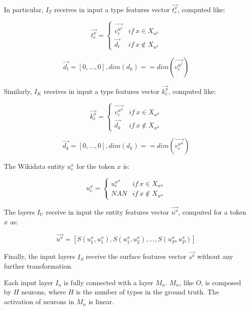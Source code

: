 \documentclass{llncs}
\begin{document}
In particular, $I_T$  receives in input a type features vector $\vec{t^{x}_{e}}$, computed like:

\begin{equation} \label{eq:type_feat}
\vec{t^{x}_{e}} = \left\{\begin{matrix} 
\vec{v^{w^t}_{e}} & if \: x \in X_{w^{t}}\\
\vec{d_t} & if \: x \notin X_{w^{t}}
\end{matrix}\right.
\end{equation}

$$\vec{d_t} = [0,...,0], dim(d_k) == dim(\vec{v^{w^{t}}_{e}})$$

Similarly, $I_K$  receives in input a type features vector $\vec{k^{x}_{e}}$, computed like:

\begin{equation} \label{eq:score_feat}
\vec{k^{x}_{e}} = \left\{\begin{matrix} 
\vec{v^{w^k}_{e}} & if \: x \in X_{w^{k}}\\
\vec{d_k} & if \: x \notin X_{w^{k}}
\end{matrix}\right.
\end{equation}

$$\vec{d_k} = [0,...,0], dim(d_k) == dim(\vec{v^{w^{k}}_{e}})$$

The Wikidata entity $u^{x}_{e}$ for the token $x$ is:

\begin{equation} \label{eq:score_feat1}
u^{x}_{e} = \left\{\begin{matrix} 
u^{w^{u}}_{e} & if \: x \in X_{w^{u}}\\
NAN & if \: x \notin X_{w^{u}}
\end{matrix}\right.
\end{equation}

The layers $I_U$ receive in input the entity features vector $\vec{u^{x}}$, computed for a token $x$ as:

$$ \vec{u^{x}} = [S(u^{x}_{1},u^{x}_{1}),S(u^{x}_{1},u^{x}_{2}),...,S(u^{x}_{P},u^{x}_{P})] $$

Finally, the input layers $I_S$ receive the surface features vector $\vec{s^{x}}$ without any further transformation.



Each input layer $I_n$ is fully connected with a layer $M_n$. $M_n$, like $O$, is composed by $H$ neurons, where $H$ is the number of types in the ground truth. The activation of neurons in $M_n$ is linear.
\end{document}
